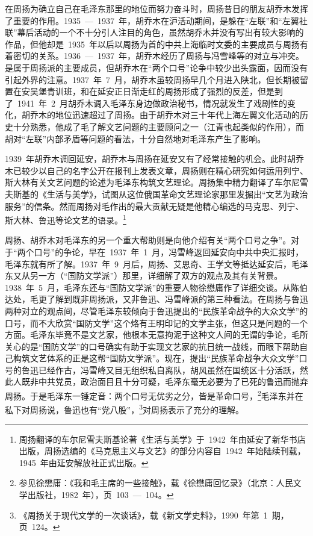 在周扬为确立自己在毛泽东那里的地位而努力奋斗时，周扬昔日的朋友胡乔木发挥了重要的作用。1935~—~1937~年，胡乔木在沪活动期间，是躲在“左联”和“左翼社联”幕后活动的一个不十分引人注目的角色，虽然胡乔木并没有写出有较大影响的作品，但他却是~1935~年以后以周扬为首的中共上海临时文委的主要成员与周扬有着密切的关系。1936~—~1937~年，胡乔木经历了周扬与冯雪峰等的对立与冲突。是属于周扬派的主要成员，但胡乔木在“两个口号”论争中较少出头露面，因而没有引起外界的注意。1937~年~7~月，胡乔木虽较周扬早几个月进入陕北，但长期被留置在安吴堡青训班，和在延安正日渐走红的周扬形成了强烈的反差，但是到了~1941~年~2~月胡乔木调入毛泽东身边做政治秘书，情况就发生了戏剧性的变化，胡乔木的地位迅速超过了周扬。由于胡乔木对三十年代上海左翼文化活动的历史十分熟悉，他成了毛了解文艺问题的主要顾问之一（江青也起类似的作用），而胡对“左联”内部矛盾等问题的看法，十分自然地对毛泽东产生了影响。

1939~年胡乔木调回延安，胡乔木与周扬在延安又有了经常接触的机会。此时胡乔木已较少以自己的名字公开在报刊上发表文章，周扬则在精心研究如何运用列宁、斯大林有关文艺问题的论述为毛泽东构筑文艺理论。周扬集中精力翻译了车尔尼雪夫斯基的《生活与美学》，试图从这位俄国革命文艺理论家那里发掘出“文艺为政治服务”的信条。然而周扬对毛作出的最大贡献无疑是他精心编选的马克思、列宁、斯大林、鲁迅等论文艺的语录。\footnote{周扬翻译的车尔尼雪夫斯基论著《生活与美学》于~1942~年由延安了新华书店出版，周扬选编的《马克思主义与文艺》的部分内容自~1942~年始陆续刊载，1945~年由延安解放社正式出版。}

周扬、胡乔木对毛泽东的另一个重大帮助则是向他介绍有关“两个口号之争”。对于“两个口号”的争论，早在~1937~年~1~月，冯雪峰返回延安向中共中央汇报时，毛泽东就有所了解。1937~年~9~月后，周扬、艾思奇、王学文等抵达延安后，毛泽东又从另一方（“国防文学派”）那里，详细解了双方的观点及其有关背景。1938~年~5~月，毛泽东还与“国防文学派”的重要人物徐懋庸作了详细交谈。从陈伯达处，毛更了解到既非周扬派，又非鲁迅、冯雪峰派的第三种看法。在周扬与鲁迅两种对立的观点间，尽管毛泽东较倾向于鲁迅提出的“民族革命战争的大众文学”的口号，而不大欣赏“国防文学”这个烙有王明印记的文学主张，但这只是问题的一个方面。毛泽东毕竟不是文艺家，他根本无意拘泥于这种文人间的无谓的争论，毛所关心的是“国防文学”的口号确实有助于实现文艺家的抗日统一战线，而眼下帮助自己构筑文艺体系的正是这帮“国防文学派”。现在，提出“民族革命战争大众文学”口号的鲁迅已经作古，冯雪峰又目无组织私自离队，胡风虽然在国统区十分活跃，然此人既非中共党员，政治面目且十分可疑，毛泽东毫无必要为了已死的鲁迅而抛弃周扬。于是毛泽东一锤定音：两个口号无优劣之分，皆是革命口号，\footnote{参见徐懋庸：《我和毛主席的一些接触》，载《徐懋庸回忆录》（北京：人民文学出版社，1982~年），页~103~—~104。}毛泽东并在私下对周扬说，鲁迅也有“党八股”，\footnote{《周扬关于现代文学的一次谈话》，载《新文学史料》，1990~年第~1~期，页~124。}对周扬表示了充分的理解。

